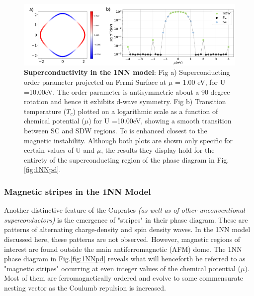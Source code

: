 \documentclass[12pt]{article}
\begin{document}
\begin{figure}[htbp]  %
    \centering
    \includegraphics[width=1.0\textwidth]{1NNSC.png}  %
    \caption{\textbf{Superconductivity in the 1NN model}:  
    Fig a) Superconducting order parameter projected on Fermi Surface at $\mu$ = 1.00 eV, 
    for U =10.00eV. The order parameter is antisymmetric about a 90 degree rotation and hence
    it exhibits d-wave symmetry. 
    Fig b) Transition temperature ($T_c$) plotted on a logarithmic scale as a function of chemical potential ($\mu$) for U =10.00eV, showing
    a smooth transition between SC and SDW regions.
    Tc is enhanced closest to the magnetic instability. 
    Although both plots are shown only specific for certain values of U and $\mu$, the results they display hold for the entirety of
    the superconducting region of the phase diagram in Fig.\ref{fig:1NNpd}.  
    }
    \label{fig:1NNSC}
\end{figure}



\subsubsection{Magnetic stripes in the 1NN Model}
\label{subsec:Stripes1NN}

Another distinctive feature of the Cuprates \textit{(as well as of other unconventional superconductors}\cite{levi1998stripes}\textit{)} is 
the emergence of "stripes" in their phase diagram. These are patterns of alternating
charge-density and spin density waves\cite{zachar1998landau, vojta2009lattice}. 
In the 1NN model discussed here, these patterns are not observed. However, magnetic regions of 
interest are found outside the main antiferromagnetic (AFM) dome. 
The 1NN phase diagram in Fig.\ref{fig:1NNpd} reveals what will henceforth be referred to as "magnetic stripes" 
occurring at even integer values of the chemical potential ($\mu$). Most of them are ferromagnetically ordered and evolve to some commensurate 
nesting vector as the Coulumb repulsion is increased.\par
\medskip
\end{document}
